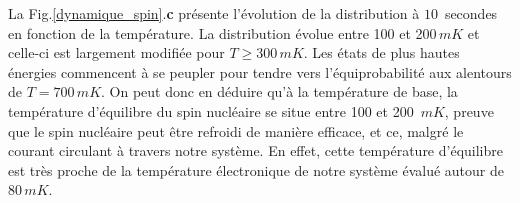La Fig.\ref{dynamique_spin}.\textbf{c} présente l'évolution de la distribution à $10\,$ secondes en fonction de la température. La distribution évolue entre 100 et 200$\,mK$ et celle-ci est largement modifiée pour $T\geq 300\,mK$. Les états de plus hautes énergies commencent à se peupler pour tendre vers l'équiprobabilité aux alentours de $T=700\,mK$. On peut donc en déduire qu'à la température de base, la température d'équilibre du spin nucléaire se situe entre 100 et 200 $\,mK$, preuve que le spin nucléaire peut être refroidi de manière efficace, et ce, malgré le courant circulant à travers notre système. En effet, cette température d'équilibre est très proche de la température électronique de notre système évalué autour de $80\,mK$.
